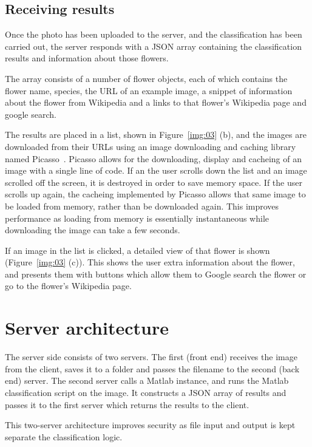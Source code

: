 \documentclass[11pt, a4paper]{report}
\begin{document}
\subsection{Receiving results}

Once the photo has been uploaded to the server, and the classification has been carried out, the server responds with a JSON array containing the classification results and information about those flowers. 

The array consists of a number of flower objects, each of which contains the flower name, species, the URL of an example image, a snippet of information about the flower from Wikipedia and a links to that flower's Wikipedia page and google search.

The results are placed in a list, shown in Figure~\ref{img:03} (b), and the images are downloaded from their URLs using an image downloading and caching library named Picasso~\cite{AndroidDev:Picasso}. Picasso allows for the downloading, display and cacheing of an image with a single line of code. If an the user scrolls down the list and an image scrolled off the screen, it is destroyed in order to save memory space. If the user scrolls up again, the cacheing implemented by Picasso allows that same image to be loaded from memory, rather than be downloaded again. This improves performance as loading from memory is essentially instantaneous while downloading the image can take a few seconds.

If an image in the list is clicked, a detailed view of that flower is shown (Figure~\ref{img:03} (c)). This shows the user extra information about the flower, and presents them with buttons which allow them to Google search the flower or go to the flower's Wikipedia page. 



\section{Server architecture}


The server side consists of two servers. The first (front end) receives the image from the client, saves it to a folder and passes the filename to the second (back end) server. The second server calls a Matlab instance, and runs the Matlab classification script on the image. It constructs a JSON array of results and passes it to the first server which returns the results to the client. 

This two-server architecture improves security as file input and output is kept separate the classification logic.
\end{document}
